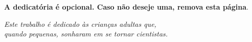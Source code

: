 \begin{dedicatoria}
   \vspace*{21cm}
   \centering
   \noindent
	\textbf{A dedicatória é opcional. Caso não deseje uma, remova esta página}.

   \textit{Este trabalho é dedicado às crianças adultas que,\\
   quando pequenas, sonharam em se tornar cientistas.} \vspace*{\fill}

\end{dedicatoria}
